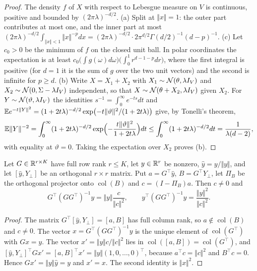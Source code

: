 \begin{proof}
The density $f$ of $X$ with respect to Lebesgue measure on $V$ is continuous, positive and bounded by $(2\pi\lambda)^{-d/2}$. (a) Split at $\Vert x\Vert=1$: the outer part contributes at most one, and the inner part at most $(2\pi\lambda)^{-d/2}\int_{\Vert x\Vert<1}\Vert x\Vert^{-p}dx=(2\pi\lambda)^{-d/2}\cdot2\pi^{d/2}\Gamma(d/2)^{-1}(d-p)^{-1}$. (c) Let $c_0>0$ be the minimum of $f$ on the closed unit ball. In polar coordinates the expectation is at least $c_0\bigl(\int g(\omega)d\omega\bigr)\bigl(\int_0^1r^{d-1-p}dr\bigr)$, where the first integral is positive (for $d=1$ it is the sum of $g$ over the two unit vectors) and the second is infinite for $p\ge d$. (b) Write $X=X_1+X_2$ with $X_1\sim\mathcal{N}(\theta,\lambda I_V)$ and $X_2\sim\mathcal{N}(0,\Sigma-\lambda I_V)$ independent, so that $X\sim\mathcal{N}(\theta+X_2,\lambda I_V)$ given $X_2$. For $Y\sim\mathcal{N}(\vartheta,\lambda I_V)$ the identities $s^{-1}=\int_0^\infty e^{-ts}dt$ and $\mathbb{E} e^{-t\Vert Y\Vert^2}=(1+2t\lambda)^{-d/2}\exp\bigl(-t\Vert\vartheta\Vert^2/(1+2t\lambda)\bigr)$ give, by Tonelli's theorem,
\begin{equation}\label{eq:lrn-laplace}
\mathbb{E}\Vert Y\Vert^{-2}=\int_0^\infty(1+2t\lambda)^{-d/2}\exp\Bigl(-\frac{t\Vert\vartheta\Vert^2}{1+2t\lambda}\Bigr)dt\le\int_0^\infty(1+2t\lambda)^{-d/2}dt=\frac{1}{\lambda(d-2)},
\end{equation}
with equality at $\vartheta=0$. Taking the expectation over $X_2$ proves (b).
\end{proof}

\begin{lemma}\label{lem:lrn-schur}
Let $G\in\mathbb{R}^{r\times K}$ have full row rank $r\le K$, let $y\in\mathbb{R}^r$ be nonzero, $\hat y=y/\Vert y\Vert$, and let $[\hat y,Y_\perp]$ be an orthogonal $r\times r$ matrix. Put $a=G^\top\hat y$, $B=G^\top Y_\perp$, let $\Pi_B$ be the orthogonal projector onto $\operatorname{col}(B)$ and $c=(I-\Pi_B)a$. Then $c\neq0$ and
\begin{equation}\label{eq:lrn-schur}
G^\top(GG^\top)^{-1}y=\Vert y\Vert\frac{c}{\Vert c\Vert^2},\qquad y^\top(GG^\top)^{-1}y=\frac{\Vert y\Vert^2}{\Vert c\Vert^2}.
\end{equation}
\end{lemma}

\begin{proof}
The matrix $G^\top[\hat y,Y_\perp]=[a,B]$ has full column rank, so $a\notin\operatorname{col}(B)$ and $c\ne0$. The vector $x=G^\top(GG^\top)^{-1}y$ is the unique element of $\operatorname{col}(G^\top)$ with $Gx=y$. The vector $x'=\Vert y\Vert c/\Vert c\Vert^2$ lies in $\operatorname{col}([a,B])=\operatorname{col}(G^\top)$, and $[\hat y,Y_\perp]^\top Gx'=[a,B]^\top x'=\Vert y\Vert(1,0,\dots,0)^\top$, because $a^\top c=\Vert c\Vert^2$ and $B^\top c=0$. Hence $Gx'=\Vert y\Vert\hat y=y$ and $x'=x$. The second identity is $\Vert x\Vert^2$.
\end{proof}

